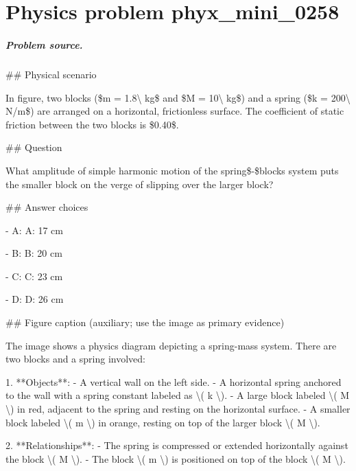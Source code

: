 
\chapter{Physics problem phyx\_mini\_0258}
\label{ch:PhyXMiniProblems_problem_phyx_mini_0258}

\paragraph{Problem source.}
\#\# Physical scenario

In figure, two blocks (\$m = 1.8\textbackslash{} kg\$ and \$M = 10\textbackslash{} kg\$) and a spring (\$k = 200\textbackslash{} N/m\$) are arranged on a horizontal, frictionless surface. The coefficient of static friction between the two blocks is \$0.40\$.

\#\# Question

What amplitude of simple harmonic motion of the spring\$-\$blocks system puts the smaller block on the verge of slipping over the larger block?

\#\# Answer choices

- A: A: 17 cm

- B: B: 20 cm

- C: C: 23 cm

- D: D: 26 cm

\#\# Figure caption (auxiliary; use the image as primary evidence)

The image shows a physics diagram depicting a spring-mass system. There are two blocks and a spring involved:

1. **Objects**:
   - A vertical wall on the left side.
   - A horizontal spring anchored to the wall with a spring constant labeled as \textbackslash{}( k \textbackslash{}).
   - A large block labeled \textbackslash{}( M \textbackslash{}) in red, adjacent to the spring and resting on the horizontal surface.
   - A smaller block labeled \textbackslash{}( m \textbackslash{}) in orange, resting on top of the larger block \textbackslash{}( M \textbackslash{}).

2. **Relationships**:
   - The spring is compressed or extended horizontally against the block \textbackslash{}( M \textbackslash{}).
   - The block \textbackslash{}( m \textbackslash{}) is positioned on top of the block \textbackslash{}( M \textbackslash{}).

